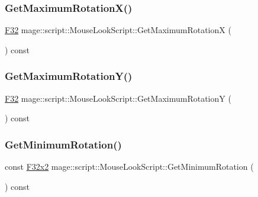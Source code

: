 \subsubsection{\texorpdfstring{Get\+Maximum\+Rotation\+X()}{GetMaximumRotationX()}}
{\footnotesize\ttfamily \mbox{\hyperlink{namespacemage_aa97e833b45f06d60a0a9c4fc22ae02c0}{F32}} mage\+::script\+::\+Mouse\+Look\+Script\+::\+Get\+Maximum\+RotationX (\begin{DoxyParamCaption}{ }\end{DoxyParamCaption}) const\hspace{0.3cm}{\ttfamily [noexcept]}}

\mbox{\label{classmage_1_1script_1_1_mouse_look_script_a24f48ac9e66f9c14645db71fd55ab9c6}} 
\subsubsection{\texorpdfstring{Get\+Maximum\+Rotation\+Y()}{GetMaximumRotationY()}}
{\footnotesize\ttfamily \mbox{\hyperlink{namespacemage_aa97e833b45f06d60a0a9c4fc22ae02c0}{F32}} mage\+::script\+::\+Mouse\+Look\+Script\+::\+Get\+Maximum\+RotationY (\begin{DoxyParamCaption}{ }\end{DoxyParamCaption}) const\hspace{0.3cm}{\ttfamily [noexcept]}}

\mbox{\label{classmage_1_1script_1_1_mouse_look_script_a09e7e193cf2f5dca3342a130268a7a67}} 
\subsubsection{\texorpdfstring{Get\+Minimum\+Rotation()}{GetMinimumRotation()}}
{\footnotesize\ttfamily const \mbox{\hyperlink{namespacemage_aee4759dedc8def6c6dec26b5c7eddf29}{F32x2}} mage\+::script\+::\+Mouse\+Look\+Script\+::\+Get\+Minimum\+Rotation (\begin{DoxyParamCaption}{ }\end{DoxyParamCaption}) const\hspace{0.3cm}{\ttfamily [noexcept]}}

